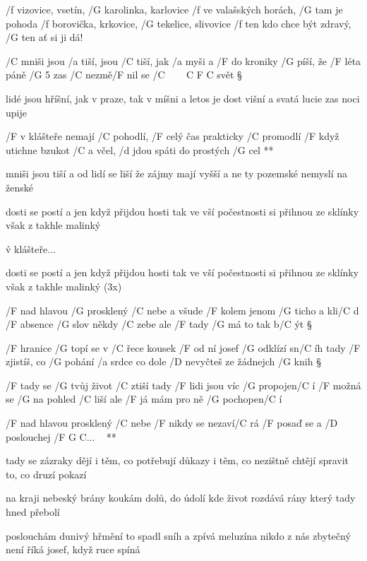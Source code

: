 /f vizovice, vsetín, /G karolinka, karlovice
/f ve valašských horách, /G tam je pohoda
/f borovička, krkovice, /G tekelice, slivovice
/f ten kdo chce být zdravý, /G ten ať si ji dá!




/C mniši jsou /a tiší, jsou /C tiší, jak /a myši
a /F do kroniky /G píší, že /F léta páně /G 5
zas /C nezmě/F nil se /{C ~~~ C F C} svět \S

lidé jsou hříšní, jak v praze, tak v míšni
a letos je dost višní a svatá lucie zas noci upije

\R  /F v klášteře nemají /C pohodlí, /F celý čas prakticky /C promodlí
    /F když utichne bzukot /{C a} včel, /d jdou spáti do prostých /G cel **

mniši jsou tiší a od lidí se liší
že zájmy mají vyšší a ne ty pozemské
nemyslí na ženské \s

dosti se postí a jen když přijdou hosti
tak ve vší počestnosti si přihnou ze sklínky
však z takhle malinký

\r v klášteře...

dosti se postí a jen když přijdou hosti
tak ve vší počestnosti si přihnou ze sklínky
však z takhle malinký (3x)




/F nad hlavou /G prosklený /C nebe
a všude /F kolem jenom /G ticho a kli/C d
/F absence /G slov někdy /C zebe
ale /F tady /G má to tak b/C ýt \S

/F hranice /G topí se v /C řece
kousek /F od ní josef /G odklízí sn/C íh
tady /F zjistíš, co /G pohání /a srdce
co dole /D nevyčteš ze žádnejch /G knih \S

/F tady se /G tvůj život /C ztiší
tady /F lidi jsou víc /G propojen/C í
/F možná se /G na pohled /C liší
ale /F já mám pro ně /G pochopen/C í

\R  /F nad hlavou prosklený /C nebe
    /F nikdy se nezaví/C rá
    /F posaď se a /D poslouchej /{F G C...} ~ **

tady se zázraky dějí
i těm, co potřebují důkazy
i těm, co nezištně chtějí
spravit to, co druzí pokazí \s

na kraji nebeský brány
koukám dolů, do údolí
kde život rozdává rány
který tady hned přebolí \s

poslouchám dunivý hřmění
to spadl sníh a zpívá meluzína
nikdo z nás zbytečný není
říká josef, když ruce spíná


